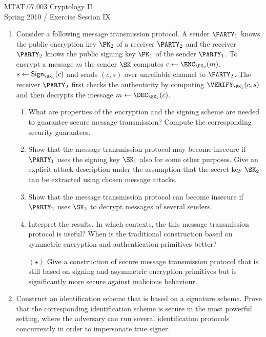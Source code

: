 \documentclass{article}
\begin{document}
\noindent	
MTAT.07.003 Cryptology II\\
Spring 2010 / Exercise Session IX




\begin{enumerate}





\item Consider a following message transmission protocol. A sender
  $\PARTY_1$ knows the public encryption key $\PK_2$ of a receiver
  $\PARTY_2$ and the receiver $\PARTY_2$ knows the public signing key
  $\PK_1$ of the sender $\PARTY_1$. To encrypt a message $m$ the
  sender $\SK$ computes $c\gets\ENC_{\PK_2}(m)$,
  $s\gets\SIGN_{\SK_1}(c)$ and sends $(c,s)$ over unreliable channel
  to $\PARTY_2$. The receiver $\PARTY_2$ first checks the authenticity
  by computing $\VERIFY_{\PK_1}(c,s)$ and then decrypts the message
  $m\gets\DEC_{\SK_2}(c)$.

  \begin{enumerate}
  \item What are properties of the encryption and the signing scheme
    are needed to guarantee secure message transmission? Compute the
    corresponding security guarantees.
  \item Show that the message transmission protocol may become
    insecure if $\PARTY_1$ uses the signing key $\SK_1$ also for some
    other purposes. Give an explicit attack description under the
    assumption that the secret key $\SK_2$ can be extracted using
    chosen message attacks.

  \item Show that the message transmission protocol can become
    insecure if $\PARTY_2$ uses $\SK_2$ to decrypt messages of several
    senders.
 
  \item Interpret the results.  In which contexts, the this message
    transmission protocol is useful? When is the traditional
    construction based on symmetric encryption and authentication
    primitives better?

  \item[$(\star)$] Give a construction of secure message transmission
    protocol that is still based on signing and asymmetric encryption
    primitives but is significantly more secure against malicious
    behaviour.
 
  \end{enumerate}

\item Construct an identification scheme that is based on a signature
  scheme. Prove that the corresponding identification scheme is secure
  in the most powerful setting, where the adversary can run several
  identification protocols concurrently in order to impersonate true
  signer.


\end{enumerate}
\end{document}
